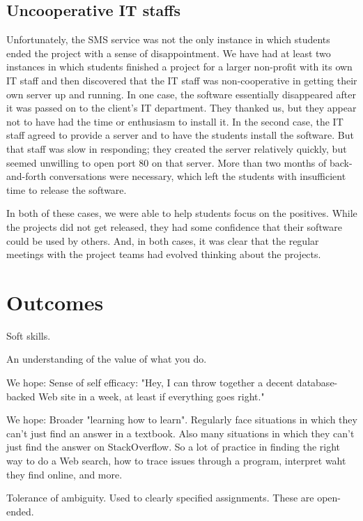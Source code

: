 \subsection{Uncooperative IT staffs}

Unfortunately, the SMS service was not the only instance in which
students ended the project with a sense of disappointment.  We have
had at least two instances in which students finished a project for
a larger non-profit with its own IT staff and then discovered that
the IT staff was non-cooperative in getting their own server up and
running.  In one case, the software essentially disappeared after
it was passed on to the client's IT department.  They thanked us,
but they appear not to have had the time or enthusiasm to install
it.  In the second case, the IT staff agreed to provide a server
and to have the students install the software.  But that staff was
slow in responding; they created the server relatively quickly, but
seemed unwilling to open port 80 on that server.  More than two
months of back-and-forth conversations were necessary, which left
the students with insufficient time to release the software.

In both of these cases, we were able to help students focus on the
positives.  While the projects did not get released, they had some
confidence that their software could be used by others.  And, in
both cases, it was clear that the regular meetings with the project
teams had evolved thinking about the projects.

\section{Outcomes}

Soft skills.

An understanding of the value of what you do.

We hope: Sense of self efficacy: "Hey, I can throw together a decent
database-backed Web site in a week, at least if everything goes right."

We hope: Broader "learning how to learn".  Regularly face situations
in which they can't just find an answer in a textbook.  Also many
situations in which they can't just find the answer on StackOverflow.
So a lot of practice in finding the right way to do a Web search,
how to trace issues through a program, interpret waht they find online,
and more.

Tolerance of ambiguity.  Used to clearly specified assignments.  These
are open-ended.

